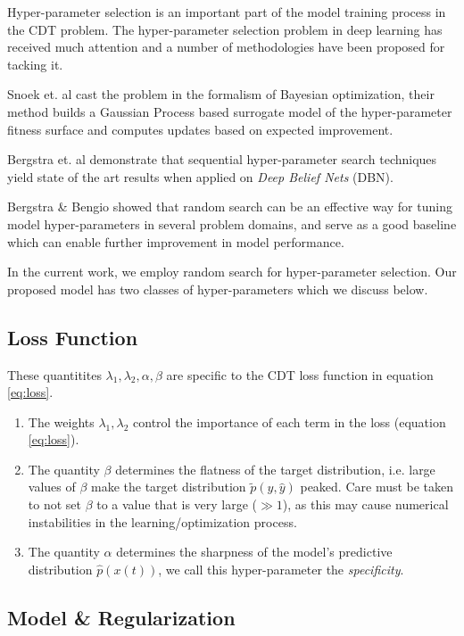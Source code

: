 \documentclass[envcountsect,runningheads]{llncs}
\theoremstyle{etoile}
\begin{document}
Hyper-parameter selection is an important part of the model training process in the CDT problem. 
The hyper-parameter selection problem in deep learning has received much attention and a number 
of methodologies have been proposed for tacking it. 

Snoek et. al \cite{snoek2012practical} cast the problem in the formalism of Bayesian optimization, their method 
builds a Gaussian Process based surrogate model of the hyper-parameter fitness surface and computes 
updates based on expected improvement. 


Bergstra et. al \cite{hypBengio} demonstrate that sequential hyper-parameter search techniques yield state of the art 
results when applied on \emph{Deep Belief Nets} (DBN). 

Bergstra \& Bengio \cite{randomsearchBengio} showed that random search can be an effective way for tuning model 
hyper-parameters in several problem domains, and serve as a good baseline which can enable 
further improvement in model performance.

In the current work, we employ random search for hyper-parameter selection. 
Our proposed model has two classes of hyper-parameters which we discuss below.

\subsection{Loss Function}

These quantitites $\lambda_1, \lambda_2, \alpha, \beta$ are specific to the CDT loss function in equation 
\ref{eq:loss}. 

\begin{enumerate}
\item The weights $\lambda_1, \lambda_2$ control the importance of each term in the loss (equation \ref{eq:loss}).
\item The quantity $\beta$ determines the flatness of the target distribution, i.e. large values of $\beta$ 
      make the target distribution $\tilde{p}(y, \hat{y})$ peaked. Care must be taken to not set $\beta$ to a value
      that is very large ($\gg 1$), as this may cause numerical instabilities in the learning/optimization process.
\item The quantity $\alpha$ determines the sharpness of the model's predictive distribution $\hat{p}(x(t))$, 
      we call this hyper-parameter the \emph{specificity}.        
\end{enumerate}
 

\subsection{Model \& Regularization}
\end{document}
